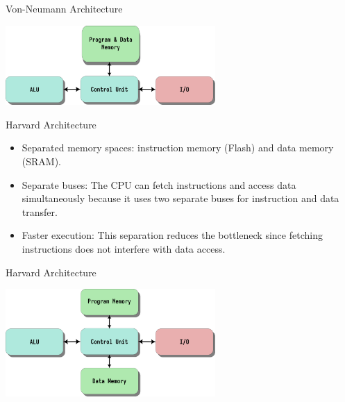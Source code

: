 \documentclass[aspectratio=169]{beamer}
\begin{document}
\begin{frame}{Von-Neumann Architecture}
\begin{center}
  \includegraphics[width=0.6\textwidth]{assets/von_neumann_arch.png}  
\end{center}
\end{frame}

\begin{frame}{Harvard Architecture}
  \begin{itemize}
      \item <1-> Separated memory spaces: instruction memory (Flash) and data memory (SRAM).
      \item <2-> Separate buses: The CPU can fetch instructions and access data simultaneously because it uses two separate buses for instruction and data transfer.
      \item <3-> Faster execution: This separation reduces the bottleneck since fetching instructions does not interfere with data access.
  \end{itemize}
\end{frame}

\begin{frame}{Harvard Architecture}
\begin{center}
  \includegraphics[width=0.6\textwidth]{assets/harvard_arch.png}  
\end{center}
\end{frame}
\end{document}
